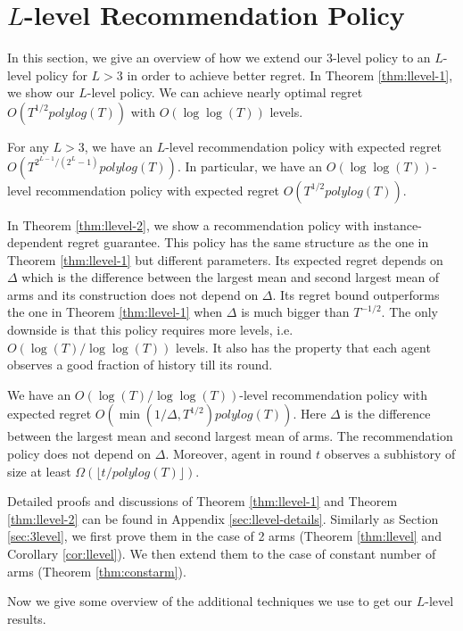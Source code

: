 
\section{$L$-level Recommendation Policy}
\label{sec:llevel}
In this section, we give an overview of how we extend our 3-level policy to an $L$-level policy for $L > 3$ in order to achieve better regret. In Theorem \ref{thm:llevel-1}, we show our $L$-level policy. We can achieve nearly optimal regret $O(T^{1/2} polylog(T))$ with $O(\log\log(T))$ levels.
\begin{theorem}
\label{thm:llevel-1}
For any $L > 3$, we have an $L$-level recommendation policy with expected regret \\$O\left(T^{2^{L-1}/(2^L-1)} polylog(T) \right)$. In particular, we have an $O(\log\log(T))$-level recommendation policy with expected regret $O(T^{1/2} polylog(T))$. 
\end{theorem}

In Theorem \ref{thm:llevel-2}, we show a recommendation policy with instance-dependent regret guarantee. This policy has the same structure as the one in Theorem \ref{thm:llevel-1} but different parameters. Its expected regret depends on $\Delta$ which is the difference between the largest mean and second largest mean of arms and its construction does not depend on $\Delta$. Its regret bound outperforms the one in Theorem \ref{thm:llevel-1} when $\Delta$ is much bigger than $T^{-1/2}$. The only downside is that this policy requires more levels, i.e. $O(\log(T)/\log\log(T))$ levels. It also has the property that each agent observes a good fraction of history till its round. 

\begin{theorem}
\label{thm:llevel-2}
 We have an $O(\log(T)/\log\log(T))$-level recommendation policy with expected regret $O(\min(1/\Delta, T^{1/2})polylog(T))$. Here $\Delta$ is the difference between the largest mean and second largest mean of arms. The recommendation policy does not depend on $\Delta$. Moreover, agent in round $t$ observes a subhistory of size at least $\Omega( \lfloor t/polylog(T)\rfloor)$. 
\end{theorem}

Detailed proofs and discussions of Theorem \ref{thm:llevel-1} and Theorem \ref{thm:llevel-2} can be found in Appendix \ref{sec:llevel-details}. Similarly as Section \ref{sec:3level}, we first prove them in the case of 2 arms (Theorem \ref{thm:llevel} and Corollary \ref{cor:llevel}). We then extend them to the case of constant number of arms (Theorem \ref{thm:constarm}).

Now we give some overview of the additional techniques we use to get our $L$-level results. 


